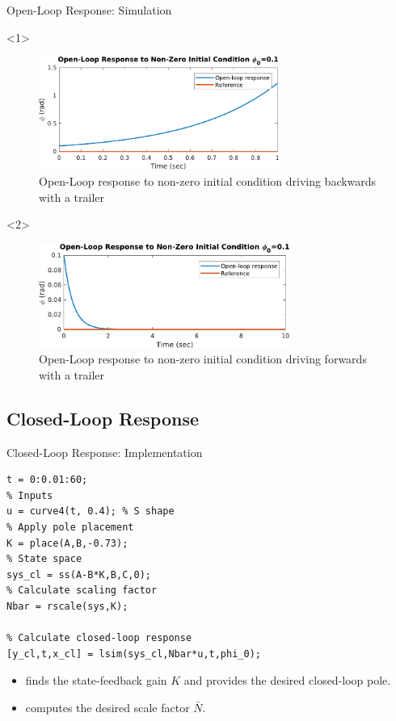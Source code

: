 \begin{frame}{Open-Loop Response: Simulation}
\begin{onlyenv}<1>
    \begin{figure}[H]
    	\centering
    	\includegraphics[width=0.7\textwidth]{images/curve-open-loop}
    	\caption{Open-Loop response to non-zero initial condition driving backwards with a trailer}
    	\label{fig:curve-open-loop}
    \end{figure}
\end{onlyenv}

\begin{onlyenv}<2>
    \begin{figure}[H]
    	\centering
    	\includegraphics[width=0.73\textwidth]{images/stable-open-loop}
    	\caption{Open-Loop response to non-zero initial condition driving forwards with a trailer}
    	\label{fig:curve-open-loop-stable}
    \end{figure}
\end{onlyenv}
\end{frame}

\subsection{Closed-Loop Response}
\begin{frame}[fragile]{Closed-Loop Response: Implementation}

\begin{lstlisting}[language=mymatlab]
% Time in seconds
t = 0:0.01:60;
% Inputs
u = curve4(t, 0.4); % S shape
% Apply pole placement
K = place(A,B,-0.73);
% State space
sys_cl = ss(A-B*K,B,C,0);
% Calculate scaling factor
Nbar = rscale(sys,K);

% Calculate closed-loop response
[y_cl,t,x_cl] = lsim(sys_cl,Nbar*u,t,phi_0);
\end{lstlisting}

\begin{itemize}
    \item {} finds the state-feedback gain $K$ and provides the desired closed-loop pole.
    \item {} computes the desired scale factor $\bar{N}$.
\end{itemize}
\end{frame}

